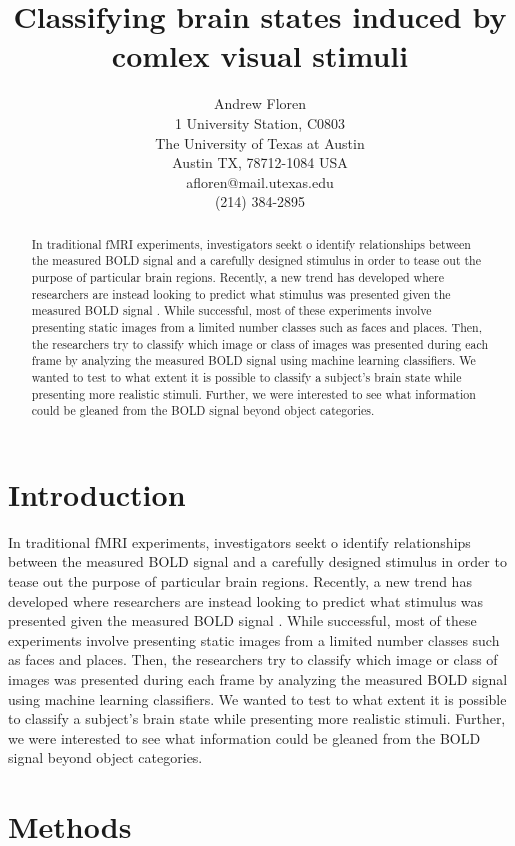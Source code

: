 \documentclass{article}
\title{Classifying brain states induced by comlex visual stimuli}
\author{Andrew Floren\\
1 University Station, C0803\\
The University of Texas at Austin\\
Austin TX, 78712-1084 USA\\
afloren@mail.utexas.edu\\
(214) 384-2895\\}
\date{}
\begin{document}
\maketitle

\begin{abstract}
In traditional fMRI experiments, investigators seekt o identify relationships between the measured BOLD signal and a carefully designed stimulus in order to tease out the purpose of particular brain regions.
Recently, a new trend has developed where researchers are instead looking to predict what stimulus was presented given the measured BOLD signal \cite{fmri-ml1,fmri-ml2,fmri-ml3}.
While successful, most of these experiments involve presenting static images from a limited number classes such as faces and places.
Then, the researchers try to classify which image or class of images was presented during each frame by analyzing the measured BOLD signal using machine learning classifiers.
We wanted to test to what extent it is possible to classify a subject's brain state while presenting more realistic stimuli.
Further, we were interested to see what information could be gleaned from the BOLD signal beyond object categories.
\end{abstract}

\tableofcontents

\section{Introduction}
In traditional fMRI experiments, investigators seekt o identify relationships between the measured BOLD signal and a carefully designed stimulus in order to tease out the purpose of particular brain regions.
Recently, a new trend has developed where researchers are instead looking to predict what stimulus was presented given the measured BOLD signal \cite{fmri-ml1,fmri-ml2,fmri-ml3}.
While successful, most of these experiments involve presenting static images from a limited number classes such as faces and places.
Then, the researchers try to classify which image or class of images was presented during each frame by analyzing the measured BOLD signal using machine learning classifiers.
We wanted to test to what extent it is possible to classify a subject's brain state while presenting more realistic stimuli.
Further, we were interested to see what information could be gleaned from the BOLD signal beyond object categories.

\section{Methods}
\end{document}

